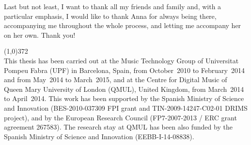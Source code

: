 Last but not least, I want to thank all my friends and family and, with a particular emphasis, I would like to thank Anna for always being there, accompanying me throughout the whole process, and letting me accompany her on her own. Thank you!


\vspace*{\fill}

\line(1,0){372}\\
\footnotesize
This thesis has been carried out at the Music Technology Group of Universitat Pompeu Fabra (UPF) in Barcelona, Spain, from October~2010 to February~2014 and from May~2014 to March~2015, and at the Centre for Digital Music of Queen Mary University of London (QMUL), United Kingdom, from March~2014 to April~2014. This work has been supported by the Spanish Ministry of Science and Innovation (BES-2010-037309 FPI grant and TIN-2009-14247-C02-01 DRIMS project), and by the European Research Council (FP7-2007-2013 / ERC grant agreement 267583). The research stay at QMUL has been also funded by the Spanish Ministry of Science and Innovation (EEBB-I-14-08838).
\normalsize